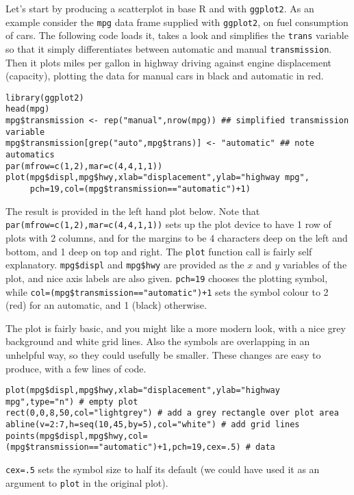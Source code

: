 \documentclass[10pt] {article}
\newcommand{\eps}[3]
{{\begin{center}
 \rotatebox{#1}{\scalebox{#2}{\texttt{[image: \#3]}}}
 \end{center}}
}
\theoremstyle{definition}
\begin{document}
Let's start by producing a scatterplot in base R and with {\tt ggplot2}. As an example consider the {\tt mpg} data frame supplied with {\tt ggplot2}, on fuel consumption of cars. The following code loads it, takes a look and simplifies the {\tt trans} variable so that it simply differentiates between automatic and manual {\tt transmission}. Then it plots miles per gallon in highway driving against engine displacement (capacity), plotting the data for manual cars in black and automatic in red. 
\begin{lstlisting}
library(ggplot2)
head(mpg)
mpg$transmission <- rep("manual",nrow(mpg)) ## simplified transmission variable
mpg$transmission[grep("auto",mpg$trans)] <- "automatic" ## note automatics
par(mfrow=c(1,2),mar=c(4,4,1,1)) 
plot(mpg$displ,mpg$hwy,xlab="displacement",ylab="highway mpg",
     pch=19,col=(mpg$transmission=="automatic")+1)
\end{lstlisting}
The result is provided in the left hand plot below. Note that \lstinline+par(mfrow=c(1,2),mar=c(4,4,1,1))+ sets up the plot device to have 1 row of plots with 2 columns, and for the margins to be 4 characters deep on the left and bottom, and 1 deep on top and right. The {\tt plot} function call is fairly self explanatory. \lstinline+mpg$displ+ and \lstinline+mpg$hwy+ are provided as the $x$ and $y$ variables of the plot, and nice axis labels are also given. \verb+pch=19+ chooses the plotting symbol, while  \lstinline^col=(mpg$transmission=="automatic")+1^ sets the symbol colour to 2 (red) for an automatic, and 1 (black) otherwise.

The plot is fairly basic, and you might like a more modern look, with a nice grey background and white grid lines. Also the symbols are overlapping in an unhelpful way, so they could usefully be smaller. These changes are easy to produce, with a few lines of code.
\begin{lstlisting}
plot(mpg$displ,mpg$hwy,xlab="displacement",ylab="highway mpg",type="n") # empty plot
rect(0,0,8,50,col="lightgrey") # add a grey rectangle over plot area 
abline(v=2:7,h=seq(10,45,by=5),col="white") # add grid lines
points(mpg$displ,mpg$hwy,col=(mpg$transmission=="automatic")+1,pch=19,cex=.5) # data
\end{lstlisting}
\lstinline+cex=.5+ sets the symbol size to half its default (we could have used it as an argument to {\tt plot} in the original plot).
\eps{-90}{.7}{mpg-base.eps}
\end{document}
